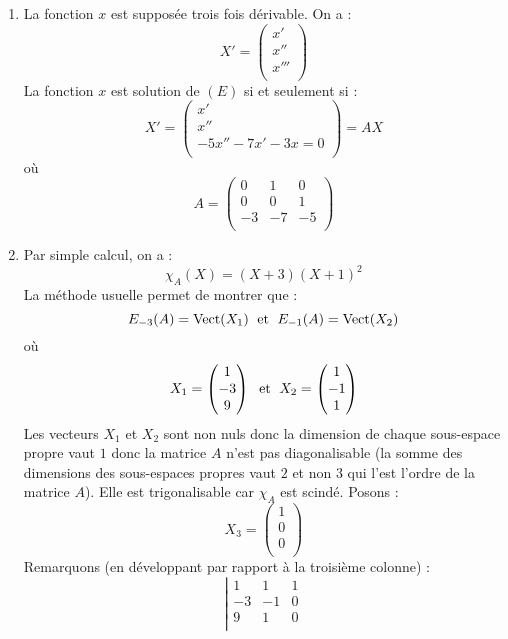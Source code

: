 \documentclass[a4paper,10pt]{report}
\begin{document}
\begin{enumerate}
\item La fonction $x$ est supposée trois fois dérivable. On a :
$$ X' = \begin{pmatrix}
x' \\
x'' \\
x''' \\
\end{pmatrix} $$
La fonction $x$ est solution de $(E)$ si et seulement si :
$$ X' = \begin{pmatrix}
x' \\
x'' \\
-5x''-7x'-3x=0 \\
\end{pmatrix} = A X$$
où
$$ A = \begin{pmatrix}
0 & 1 & 0 \\
0 & 0 & 1 \\
-3& -7 & -5 \\
\end{pmatrix}$$
\item Par simple calcul, on a :
$$ \chi_A(X) = (X+3)(X+1)^2$$
La méthode usuelle permet de montrer que :
$$ E_{-3}(A) = \textrm{Vect}(X_1) \; \hbox{ et } \;  E_{-1}(A) = \textrm{Vect}(X_2)$$
où
$$ X_1 = \begin{pmatrix}
1 \\
-3 \\
9 \\
\end{pmatrix}  \; \hbox{ et } \; X_2 = \begin{pmatrix}
1 \\
-1 \\
1 
\end{pmatrix}$$
Les vecteurs $X_1$ et $X_2$ sont non nuls donc la dimension de chaque sous-espace propre vaut $1$ donc la matrice $A$ n'est pas diagonalisable (la somme des dimensions des sous-espaces propres vaut $2$ et non $3$ qui l'est l'ordre de la matrice $A$). Elle est trigonalisable car $\chi_A$ est scindé. Posons :
$$ X_3 = \begin{pmatrix}
1 \\
0 \\
0 \\
\end{pmatrix}$$
Remarquons (en développant par rapport à la troisième colonne) :
$$ \left\vert \begin{array}{ccc}
1 & 1 & 1 \\
-3 & -1 & 0 \\
9 & 1 & 0 \\

\end{array}$$
\end{enumerate}
\end{document}
